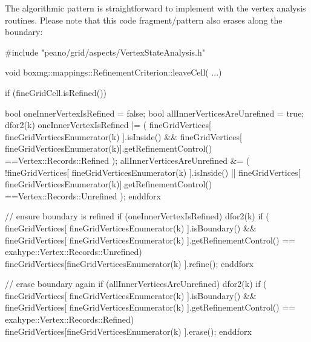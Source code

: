 \noindent
The algorithmic pattern is straightforward to implement with the vertex analysis
routines.
Please note that this code fragment/pattern also erases along the boundary:
\begin{code}
#include "peano/grid/aspects/VertexStateAnalysis.h"

void boxmg::mappings::RefinementCriterion::leaveCell( ...) {
 if (fineGridCell.isRefined()) {
  bool oneInnerVertexIsRefined      = false;
  bool allInnerVerticesAreUnrefined = true;
  dfor2(k)
   oneInnerVertexIsRefined |= 
    (
    fineGridVertices[ fineGridVerticesEnumerator(k) ].isInside() 
    &&
    fineGridVertices[ fineGridVerticesEnumerator(k)].getRefinementControl()
     ==Vertex::Records::Refined
    ); 
   allInnerVerticesAreUnrefined &= 
    (
    !fineGridVertices[ fineGridVerticesEnumerator(k) ].isInside()
    ||
    fineGridVertices[ fineGridVerticesEnumerator(k)].getRefinementControl()
     ==Vertex::Records::Unrefined
    ); 
  enddforx

  // ensure boundary is refined
  if (oneInnerVertexIsRefined) {
   dfor2(k)
    if (
     fineGridVertices[ fineGridVerticesEnumerator(k) ].isBoundary() &&
     fineGridVertices[ fineGridVerticesEnumerator(k) ].getRefinementControl() 
      == exahype::Vertex::Records::Unrefined) { 
      fineGridVertices[fineGridVerticesEnumerator(k) ].refine(); 
    }
   enddforx
  }
  
  // erase boundary again
  if (allInnerVerticesAreUnrefined) {
   dfor2(k)
    if (
     fineGridVertices[ fineGridVerticesEnumerator(k) ].isBoundary() &&
     fineGridVertices[ fineGridVerticesEnumerator(k) ].getRefinementControl() 
      == exahype::Vertex::Records::Refined) { 
      fineGridVertices[fineGridVerticesEnumerator(k) ].erase(); 
    }
   enddforx
  }
 }    
}
\end{code}
